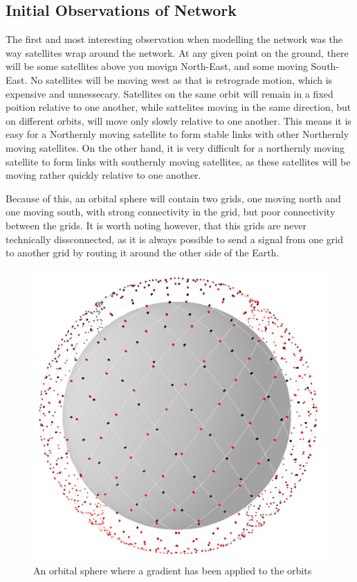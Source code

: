 \documentclass[12pt]{article}
\begin{document}
\subsection{Initial Observations of Network}
The first and most interesting observation when modelling the network was the way satellites wrap around the network. At any given point on the ground, there will be some satellites above you movign North-East, and some moving South-East. No satellites will be moving west as that is retrograde motion, which is expensive and unnessecary. Satellites on the same orbit will remain in a fixed poition relative to one another,  while sattelites moving in the same direction, but on different orbits, will move only slowly relative to one another. This means it is easy for a Northernly moving satellite to form stable links with other Northernly moving satellites. On the other hand, it is very difficult for a northernly moving satellite to form links with southernly moving satellites, as these satellites will be moving rather quickly relative to one another.

Because of this, an orbital sphere will contain two grids, one moving north and one moving south, with strong connectivity in the grid, but poor connectivity between the grids. It is worth noting however, that this grids are never technically dissconnected, as it is always possible to send a signal from one grid to another grid by routing it around the other side of the Earth.

\begin{figure}
\label{Upward and Downward Moving Satellites}
\caption{An orbital sphere where a gradient has been applied to the orbits}
\includegraphics[width=\textwidth]{UpwardAndDowardMovingSatellites}
\end{figure}
\end{document}
